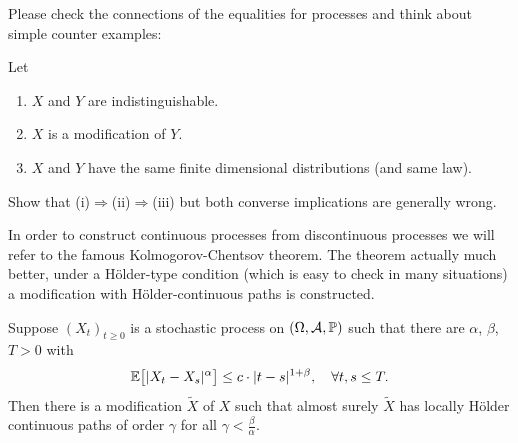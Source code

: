 Please check the connections of the equalities for processes and think about simple counter examples:
\begin{luebung}
	Let
	\begin{enumerate}[label=(\roman*)]
		\item $X$ and $Y$ are indistinguishable.
		\item $X$ is a modification of $Y$.
		\item $X$ and $Y$ have the same finite dimensional distributions (and same law).
	\end{enumerate}
	Show that (i)$\Rightarrow$(ii)$\Rightarrow$(iii) but both converse implications are generally wrong.
\end{luebung}
In order to construct continuous processes from discontinuous processes we will refer to the famous Kolmogorov-Chentsov theorem. The theorem actually much better, under a H\"older-type condition (which is easy to check in many situations) a modification with H\"older-continuous paths is constructed.
\begin{lsatzwichtig}
\begin{theorem}
	Suppose $(X_t)_{t\geq 0}$ is a stochastic process on $(\Omega,\mathcal{A},\mathbb{P})$ such that there are $\alpha$, $\beta$, $T>0$ with
	\begin{align*}
		\mathbb{E}\big[\lvert X_t - X_s \rvert^{\alpha}\big] \leq c \cdot \lvert t - s \rvert^{1+\beta},\quad \forall t,s \leq T.
	\end{align*}
	Then there is a modification $\tilde X$ of $X$ such that almost surely $\tilde X$ has locally H\"older continuous paths of order $\gamma$ for all $\gamma<\frac{\beta}{\alpha}$.
\end{theorem}
\end{lsatzwichtig}
